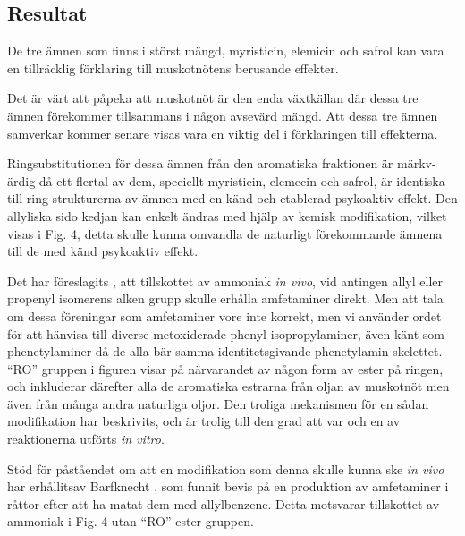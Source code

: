 \documentclass{theme/franska}
\begin{document}
{%


	\subsection{Resultat}

	De tre ämnen som finns i störst mängd, myristicin, elemicin och safrol kan vara en tillräcklig förklaring till muskotnötens berusande effekter.

	Det är värt att påpeka att muskotnöt är den enda växtkällan där dessa tre ämnen förekommer tillsammans i någon avsevärd mängd. Att dessa tre
	ämnen samverkar kommer senare visas vara en viktig del i förklaringen
	till effekterna.

	Ringsubstitutionen för dessa ämnen från den aromatiska fraktionen är märkv-ärdig då ett flertal av dem, speciellt myristicin, elemecin och safrol, är identiska till ring strukturerna av ämnen med en känd och etablerad psykoaktiv effekt. Den allyliska sido kedjan kan enkelt ändras med hjälp av kemisk modifikation, vilket visas i Fig. 4, detta skulle kunna omvandla de naturligt förekommande ämnena till de med känd psykoaktiv effekt.

	Det har föreslagits \cite{shulgin1967chemistry}, att tillskottet av ammoniak \textit{in vivo}, vid antingen allyl eller propenyl isomerens alken grupp skulle erhålla amfetaminer direkt.
	Men att tala om dessa föreningar som amfetaminer vore inte korrekt, men vi använder ordet för att hänvisa till diverse metoxiderade phenyl-isopropylaminer, även känt som phenetylaminer då de alla bär samma identitetsgivande phenetylamin skelettet.
	``RO'' gruppen i figuren visar på närvarandet av någon form av ester på ringen,	och inkluderar därefter alla de aromatiska estrarna från oljan av muskotnöt men även
	från många andra naturliga oljor.
	Den troliga mekanismen för en sådan  modifikation har beskrivits,
	och är trolig till den grad att var och en av reaktionerna utförts \textit{in vitro}.

	Stöd för påståendet om att en modifikation som denna skulle kunna ske \textit{in vivo} har erhållitsav Barfknecht \cite{shulgin1967chemistry}, som funnit bevis på en produktion av amfetaminer i råttor
	efter att ha matat dem med allylbenzene. Detta motsvarar tillskottet av
	ammoniak i Fig. 4 utan ``RO'' ester gruppen.




}
\end{document}
